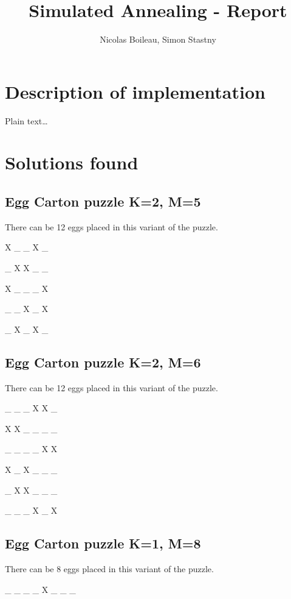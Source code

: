 \documentclass{article}
\begin{document}
\providecommand{\abs}[1]{\lvert#1\rvert}

\title{Simulated Annealing - Report}
\author{Nicolas Boileau, Simon Stastny}

\maketitle

\section{Description of implementation}
Plain text\ldots

\section{Solutions found}

\subsection{Egg Carton puzzle K=2, M=5}

There can be 12 eggs placed in this variant of the puzzle.


X \_ \_ X \_ 

\_ X X \_ \_ 

X \_ \_ \_ X 

\_ \_ X \_ X 

\_ X \_ X \_ 

\subsection{Egg Carton puzzle K=2, M=6}

There can be 12 eggs placed in this variant of the puzzle.

\_ \_ \_ X X \_ 

X X \_ \_ \_ \_ 

\_ \_ \_ \_ X X 

X \_ X \_ \_ \_ 

\_ X X \_ \_ \_ 

\_ \_ \_ X \_ X 

\subsection{Egg Carton puzzle K=1, M=8}

There can be 8 eggs placed in this variant of the puzzle.

\_ \_ \_ \_ X \_ \_ \_ 
\end{document}

